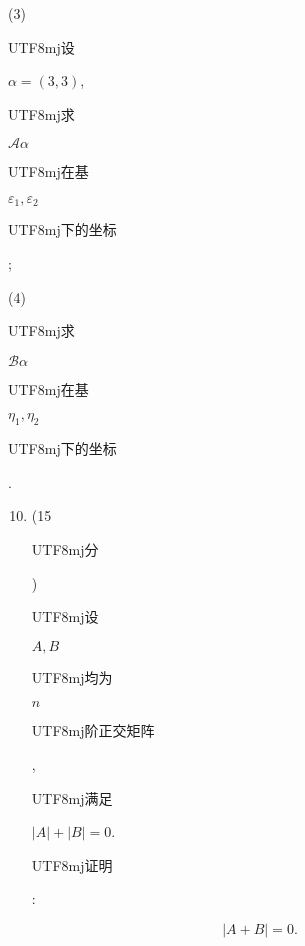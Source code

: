 \documentclass[10pt]{article}
\begin{document}
(3) \begin{CJK}{UTF8}{mj}设\end{CJK} $\alpha=(3,3)$, \begin{CJK}{UTF8}{mj}求\end{CJK} $\mathscr{A} \alpha$ \begin{CJK}{UTF8}{mj}在基\end{CJK} $\varepsilon_{1}, \varepsilon_{2}$ \begin{CJK}{UTF8}{mj}下的坐标\end{CJK};

(4) \begin{CJK}{UTF8}{mj}求\end{CJK} $\mathscr{B} \alpha$ \begin{CJK}{UTF8}{mj}在基\end{CJK} $\eta_{1}, \eta_{2}$ \begin{CJK}{UTF8}{mj}下的坐标\end{CJK}.

\begin{enumerate}
  \setcounter{enumi}{9}
  \item (15 \begin{CJK}{UTF8}{mj}分\end{CJK}) \begin{CJK}{UTF8}{mj}设\end{CJK} $A, B$ \begin{CJK}{UTF8}{mj}均为\end{CJK} $n$ \begin{CJK}{UTF8}{mj}阶正交矩阵\end{CJK}, \begin{CJK}{UTF8}{mj}满足\end{CJK} $|A|+|B|=0$. \begin{CJK}{UTF8}{mj}证明\end{CJK}:
\end{enumerate}
$$
|A+B|=0 .
$$
\end{document}
